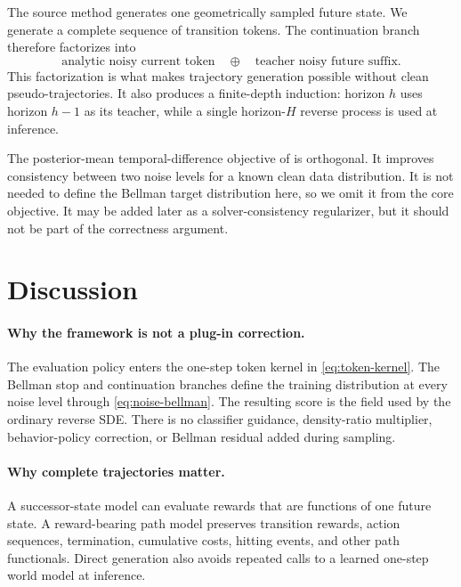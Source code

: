 \documentclass[11pt]{article}
\theoremstyle{definition}
\theoremstyle{remark}
\begin{document}
The source method generates one geometrically sampled future state. We generate
a complete sequence of transition tokens. The continuation branch therefore
factorizes into
\begin{equation}
\boxed{
\text{analytic noisy current token}
\quad\oplus\quad
\text{teacher noisy future suffix}.
}
\end{equation}
This factorization is what makes trajectory generation possible without clean
pseudo-trajectories. It also produces a finite-depth induction: horizon $h$
uses horizon $h-1$ as its teacher, while a single horizon-$H$ reverse process
is used at inference.

The posterior-mean temporal-difference objective of
\citet{ying2026tddiffusion} is orthogonal. It improves consistency between two
noise levels for a known clean data distribution. It is not needed to define
the Bellman target distribution here, so we omit it from the core objective.
It may be added later as a solver-consistency regularizer, but it should not be
part of the correctness argument.

\section{Discussion}
\label{sec:discussion}

\paragraph{Why the framework is not a plug-in correction.}
The evaluation policy enters the one-step token kernel in
\cref{eq:token-kernel}. The Bellman stop and continuation branches define the
training distribution at every noise level through \cref{eq:noise-bellman}.
The resulting score is the field used by the ordinary reverse SDE. There is no
classifier guidance, density-ratio multiplier, behavior-policy correction, or
Bellman residual added during sampling.

\paragraph{Why complete trajectories matter.}
A successor-state model can evaluate rewards that are functions of one future
state. A reward-bearing path model preserves transition rewards, action
sequences, termination, cumulative costs, hitting events, and other path
functionals. Direct generation also avoids repeated calls to a learned
one-step world model at inference.
\end{document}
